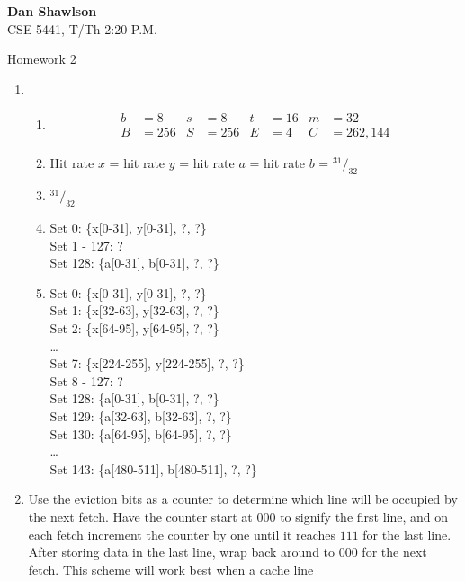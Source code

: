 \documentclass{article}
\begin{document}
  
  \begin{flushright}
  \textbf{Dan Shawlson} \\
  CSE 5441, T/Th 2:20 P.M.
  \end{flushright}
  
  \begin{Large}
  \centerline{Homework 2}
  \end{Large}
  
  \begin{enumerate}
    \item
    \begin{enumerate}
      \item
      \begin{align*}
      b&=8 & s&=8 & t&=16 & m&=32 \\
      B&=256 & S&=256 & E&=4 & C&=262,144
      \end{align*}
      \item
      Hit rate $x$ = hit rate $y$ = hit rate $a$ = hit rate $b$ = ${}^{31}/_{32}$
      \item
      ${}^{31}/_{32}$
      \item
      Set 0: \{x[0-31], y[0-31], ?, ?\} \\
      Set 1 - 127: ? \\
      Set 128: \{a[0-31], b[0-31], ?, ?\}
      \item
      Set 0: \{x[0-31], y[0-31], ?, ?\} \\
      Set 1: \{x[32-63], y[32-63], ?, ?\} \\
      Set 2: \{x[64-95], y[64-95], ?, ?\} \\
      \ldots \\
      Set 7: \{x[224-255], y[224-255], ?, ?\} \\
      Set 8 - 127: ? \\
      Set 128: \{a[0-31], b[0-31], ?, ?\} \\
      Set 129: \{a[32-63], b[32-63], ?, ?\} \\
      Set 130: \{a[64-95], b[64-95], ?, ?\} \\
      \ldots \\
      Set 143: \{a[480-511], b[480-511], ?, ?\} 
    \end{enumerate}
    \item Use the eviction bits as a counter to determine which line will be occupied by the next fetch. Have the counter start
    at $000$ to signify the first line, and on each fetch increment the counter by one until it reaches $111$ for the last line.
    After storing data in the last line, wrap back around to $000$ for the next fetch. This scheme will work best when a cache line

\end{enumerate}
\end{document}
